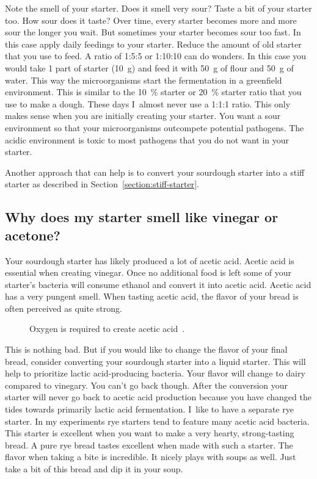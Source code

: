 Note the smell of your starter. Does it smell very sour?
Taste a bit of your starter too. How sour does it taste?
Over time, every starter becomes more and more sour the longer
you wait. But sometimes your starter becomes sour too fast.
In this case apply daily feedings to your starter. Reduce
the amount of old starter that you use to feed. A ratio
of 1:5:5 or 1:10:10 can do wonders. In this case you would
take 1 part of starter (\qty{10}{\gram}) and feed it with \qty{50}{\gram} of flour
and \qty{50}{\gram} of water. This way the microorganisms start
the fermentation in a greenfield environment. This is
similar to the \qty{10}{\percent} starter or  \qty{20}{\percent} starter
ratio that you use to make a dough. These days I~almost
never use a 1:1:1 ratio. This only makes sense when you
are initially creating your starter. You want a sour
environment so that your microorganisms outcompete
potential pathogens. The acidic environment is toxic
to most pathogens that you do not want in your starter.

Another approach that can help is to convert your
sourdough starter into a stiff starter as
described in Section~\ref{section:stiff-starter}.

\subsection{Why does my starter smell like vinegar or acetone?}

Your sourdough starter has likely produced a lot of acetic acid.
Acetic acid is essential when creating vinegar. Once no additional
food is left some of your starter's bacteria will consume ethanol
and convert it into acetic acid. Acetic acid has a very pungent smell.
When tasting acetic acid, the flavor of your bread is often perceived
as quite strong.

\begin{figure}[!htb]
\begin{center}
  
  \caption[Acetic acid creation]{Oxygen is required to create acetic
      acid~\cite{acetic+acid+production}.}%
  \label{fig:ethanol-oxidation}
\end{center}
\end{figure}

This is nothing bad. But if you would like to change
the flavor of your final bread, consider converting
your sourdough starter into a liquid starter. This will
help to prioritize lactic acid-producing bacteria.
Your flavor will change to dairy compared to vinegary.
You can't go back though. After the conversion your starter
will never go back to acetic acid production because you have
changed the tides towards primarily lactic acid fermentation.
I~like to have a separate rye starter. In my experiments
rye starters tend to feature many acetic acid bacteria.
This starter is excellent when you want to make a very hearty,
strong-tasting bread. A pure rye bread tastes excellent when
made with such a starter. The flavor when taking a bite
is incredible. It nicely plays with soups as well. Just take
a bit of this bread and dip it in your soup.

